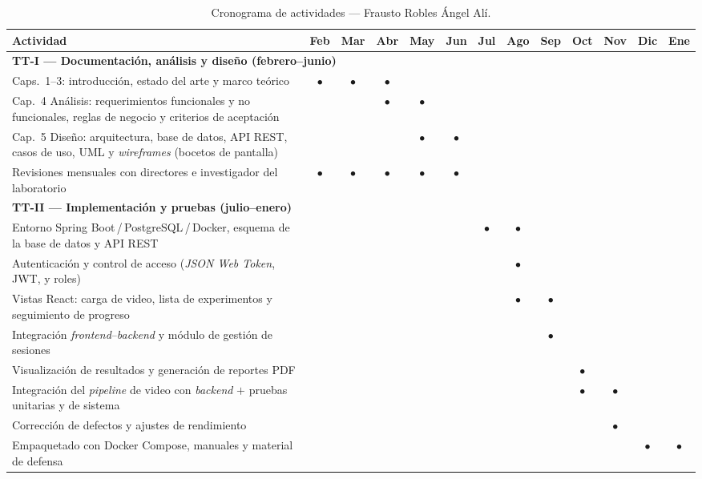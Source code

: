 \begin{table}
\centering
\caption{Cronograma de actividades --- Frausto Robles Ángel Alí.}
\label{tab:cronograma_angel}
\small
\setlength{\tabcolsep}{4pt}
\renewcommand{\arraystretch}{1.4}
\begin{tabular}{|p{8.5cm}|c|c|c|c|c||c|c|c|c|c|c|c|}
\hline
\textbf{Actividad}
  & \textbf{Feb} & \textbf{Mar} & \textbf{Abr} & \textbf{May} & \textbf{Jun}
  & \textbf{Jul} & \textbf{Ago} & \textbf{Sep} & \textbf{Oct} & \textbf{Nov} & \textbf{Dic} & \textbf{Ene} \\
\hline
\multicolumn{13}{|l|}{\textbf{TT-I --- Documentación, análisis y diseño (febrero--junio)}} \\
\hline
Caps.~1--3: introducción, estado del arte y marco teórico
  & $\bullet$ & $\bullet$ & $\bullet$ & & & & & & & & & \\
\hline
Cap.~4 Análisis: requerimientos funcionales y no funcionales, reglas de negocio y criterios de aceptación
  & & & $\bullet$ & $\bullet$ & & & & & & & & \\
\hline
Cap.~5 Diseño: arquitectura, base de datos, API REST, casos de uso, UML y \textit{wireframes} (bocetos de pantalla)
  & & & & $\bullet$ & $\bullet$ & & & & & & & \\
\hline
Revisiones mensuales con directores e investigador del laboratorio
  & $\bullet$ & $\bullet$ & $\bullet$ & $\bullet$ & $\bullet$ & & & & & & & \\
\hline
\multicolumn{13}{|l|}{\textbf{TT-II --- Implementación y pruebas (julio--enero)}} \\
\hline
Entorno Spring Boot\,/\,PostgreSQL\,/\,Docker, esquema de la base de datos y API REST
  & & & & & & $\bullet$ & $\bullet$ & & & & & \\
\hline
Autenticación y control de acceso (\textit{JSON Web Token}, JWT, y roles)
  & & & & & & & $\bullet$ & & & & & \\
\hline
Vistas React: carga de video, lista de experimentos y seguimiento de progreso
  & & & & & & & $\bullet$ & $\bullet$ & & & & \\
\hline
Integración \textit{frontend}--\textit{backend} y módulo de gestión de sesiones
  & & & & & & & & $\bullet$ & & & & \\
\hline
Visualización de resultados y generación de reportes PDF
  & & & & & & & & & $\bullet$ & & & \\
\hline
Integración del \textit{pipeline} de video con \textit{backend} $+$ pruebas unitarias y de sistema
  & & & & & & & & & $\bullet$ & $\bullet$ & & \\
\hline
Corrección de defectos y ajustes de rendimiento
  & & & & & & & & & & $\bullet$ & & \\
\hline
Empaquetado con Docker Compose, manuales y material de defensa
  & & & & & & & & & & & $\bullet$ & $\bullet$ \\
\hline
\end{tabular}
\end{table}

